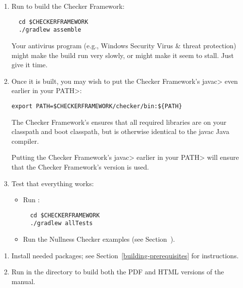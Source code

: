 \begin{enumerate}

\item
Run  to build the Checker Framework:

\begin{Verbatim}
  cd $CHECKERFRAMEWORK
  ./gradlew assemble
\end{Verbatim}

\noindent
Your antivirus program (e.g., Windows Security Virus \& threat protection)
might make the build run very slowly, or might make it seem to stall.  Just
give it time.

\item
Once it is built, you may wish to put the Checker Framework's \<javac>
even earlier in your \<PATH>:

\begin{Verbatim}
export PATH=$CHECKERFRAMEWORK/checker/bin:${PATH}
\end{Verbatim}

The Checker Framework's  ensures that all required
libraries are on your classpath and boot classpath, but is otherwise
identical to the javac Java compiler.

Putting the Checker Framework's \<javac> earlier in your \<PATH> will
ensure that the Checker Framework's version is used.

\item Test that everything works:

  \begin{itemize}

  \item Run :
\begin{Verbatim}
  cd $CHECKERFRAMEWORK
  ./gradlew allTests
\end{Verbatim}

  \item Run the Nullness Checker examples (see
    Section~).

  \end{itemize}

\end{enumerate}



\begin{enumerate}
\item
Install needed packages; see Section~\ref{building-prerequisites} for
instructions.

\item
Run  in the  directory to build both the PDF and HTML versions of the manual.
\end{enumerate}


